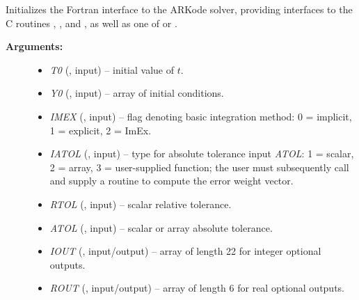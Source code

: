 \documentclass[letterpaper,10pt,english]{sphinxmanual}
\begin{document}
\begin{fulllineitems}
\label{f_interface/Usage:f/_/FARKMALLOC}
Initializes the Fortran interface to the ARKode solver, providing
interfaces to the C routines {\hyperref[c_interface/User_callable:ARKodeCreate]{}},
{\hyperref[c_interface/User_callable:ARKodeSetUserData]{}}, and {\hyperref[c_interface/User_callable:ARKodeInit]{}}, as well
as one of {\hyperref[c_interface/User_callable:ARKodeSStolerances]{}} or
{\hyperref[c_interface/User_callable:ARKodeSVtolerances]{}}.
\begin{description}
\item[{\textbf{Arguments:}}] \leavevmode\begin{itemize}
\item {} 
\emph{T0} (, input) -- initial value of $t$.

\item {} 
\emph{Y0} (, input) -- array of initial conditions.

\item {} 
\emph{IMEX} (, input) -- flag denoting basic integration
method: 0 = implicit, 1 = explicit, 2 = ImEx.

\item {} 
\emph{IATOL} (, input) -- type for absolute tolerance input
\emph{ATOL}: 1 = scalar, 2 = array, 3 = user-supplied function; the
user must subsequently call {\hyperref[f_interface/Usage:f/_/FARKEWTSET]{}} and supply
a routine {\hyperref[f_interface/Usage:f/_/FARKEWT]{}} to compute the error weight vector.

\item {} 
\emph{RTOL} (, input) -- scalar relative tolerance.

\item {} 
\emph{ATOL} (, input) -- scalar or array absolute tolerance.

\item {} 
\emph{IOUT} (, input/output) -- array of length 22 for integer optional outputs.

\item {} 
\emph{ROUT} (, input/output) -- array of length 6 for real optional outputs.


\end{itemize}
\end{description}
\end{fulllineitems}
\end{document}
